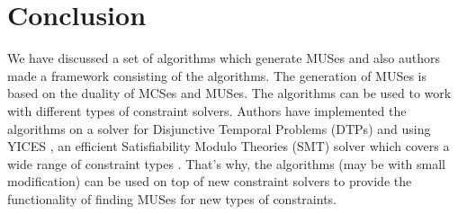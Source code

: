 \section{Conclusion}
\label{sec:conclusion}
We have discussed a set of algorithms which generate MUSes and also authors made a framework consisting of the algorithms. The generation of MUSes is based on the duality of MCSes and MUSes. The algorithms can be used to work with different types of constraint solvers. Authors have implemented the algorithms on a solver for Disjunctive Temporal Problems (DTPs) \cite{liffiton} and using YICES \cite{dutertre}, an efficient Satisfiability Modulo Theories (SMT) solver which covers a wide range of constraint types \cite{karem}. That's why, the algorithms (may be with small modification) can be used on top of new constraint solvers to provide the functionality of finding MUSes for new types of constraints.
